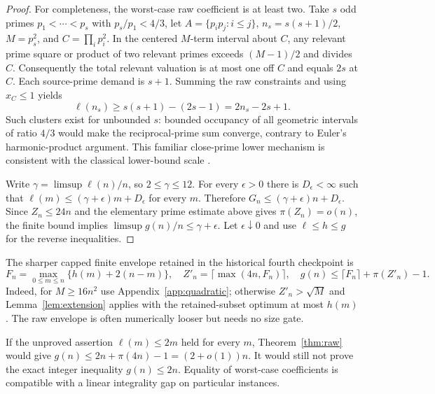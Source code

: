 \begin{proof}
For completeness, the worst-case raw coefficient is at least two. Take $s$ odd primes $p_1<\cdots<p_s$ with $p_s/p_1<4/3$, let $A=\{p_ip_j:i\le j\}$, $n_s=s(s+1)/2$, $M=p_s^2$, and $C=\prod_i p_i^2$. In the centered $M$-term interval about $C$, any relevant prime square or product of two relevant primes exceeds $(M-1)/2$ and divides $C$. Consequently the total relevant valuation is at most one off $C$ and equals $2s$ at $C$. Each source-prime demand is $s+1$. Summing the raw constraints and using $x_C\le1$ yields
\[
 \ell(n_s)\ge s(s+1)-(2s-1)=2n_s-2s+1.
\]
Such clusters exist for unbounded $s$: bounded occupancy of all geometric intervals of ratio $4/3$ would make the reciprocal-prime sum converge, contrary to Euler's harmonic-product argument. This familiar close-prime lower mechanism is consistent with the classical lower-bound scale \cite{ES1959}.

Write $\gamma=\limsup\ell(n)/n$, so $2\le\gamma\le12$. For every $\epsilon>0$ there is $D_\epsilon<\infty$ such that $\ell(m)\le(\gamma+\epsilon)m+D_\epsilon$ for every $m$. Therefore $G_n\le(\gamma+\epsilon)n+D_\epsilon$. Since $Z_n\le24n$ and the elementary prime estimate above gives $\pi(Z_n)=o(n)$, the finite bound implies $\limsup g(n)/n\le\gamma+\epsilon$. Let $\epsilon\downarrow0$ and use $\ell\le h\le g$ for the reverse inequalities.
\end{proof}

The sharper capped finite envelope retained in the historical fourth checkpoint is
\[
 F_n=\max_{0\le m\le n}\{h(m)+2(n-m)\},\quad
 Z'_n=\lceil\max(4n,F_n)\rceil,\quad
 g(n)\le\lceil F_n\rceil+\pi(Z'_n)-1.
\]
Indeed, for $M\ge16n^2$ use Appendix~\ref{app:quadratic}; otherwise $Z'_n>\sqrt M$ and Lemma~\ref{lem:extension} applies with the retained-subset optimum at most $h(m)$. The raw envelope is often numerically looser but needs no size gate.

If the unproved assertion $\ell(m)\le2m$ held for every $m$, Theorem~\ref{thm:raw} would give $g(n)\le2n+\pi(4n)-1=(2+o(1))n$. It would still not prove the exact integer inequality $g(n)\le2n$. Equality of worst-case coefficients is compatible with a linear integrality gap on particular instances.

